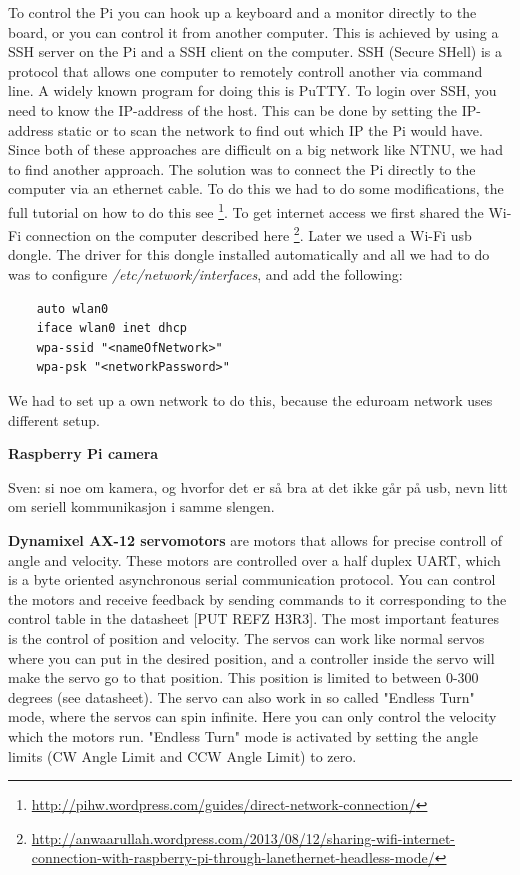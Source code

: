 To control the Pi you can hook up a keyboard and a monitor directly to the board, or you can control it from another computer. 
This is achieved by using a SSH server on the Pi and a SSH client on the computer. 
SSH (Secure SHell) is a protocol that allows one computer to remotely controll another via command line. A widely known program for doing this is PuTTY. To login over SSH, you need to know the IP-address of the host. This can be done by setting the IP-address static or to scan the network to find out which IP the Pi would have. Since both of these approaches are difficult on a big network like NTNU, we had to find another approach. The solution was to connect the Pi directly to the computer via an ethernet cable. To do this we had to do some modifications, the full tutorial on how to do this see \footnote{\url{http://pihw.wordpress.com/guides/direct-network-connection/}}. To get internet access we first shared the Wi-Fi connection on the computer described here \footnote{\url{http://anwaarullah.wordpress.com/2013/08/12/sharing-wifi-internet-connection-with-raspberry-pi-through-lanethernet-headless-mode/}}. Later we used a Wi-Fi usb dongle. The driver for this dongle installed automatically and all we had to do was to configure \textit{/etc/network/interfaces}, and add the following:
\begin{verbatim}
    auto wlan0
    iface wlan0 inet dhcp
    wpa-ssid "<nameOfNetwork>"
    wpa-psk "<networkPassword>"
\end{verbatim}
We had to set up a own network to do this, because the eduroam network uses different setup.
\bigskip

\textbf{Raspberry Pi camera}

Sven: si noe om kamera, og hvorfor det er så bra at det ikke går på usb, nevn litt om seriell kommunikasjon i samme slengen.
\bigskip

\textbf{Dynamixel AX-12 servomotors}
are motors that allows for precise controll of angle and velocity. These motors are controlled over a half duplex UART, which is a byte oriented asynchronous serial communication protocol. You can control the motors and receive feedback by sending commands to it corresponding to the control table in the datasheet [PUT REFZ H3R3]. The most important features is the control of position and velocity. The servos can work like normal servos where you can put in the desired position, and a controller inside the servo will make the servo go to that position. This position is limited to between 0-300 degrees (see datasheet). The servo can also work in so called "Endless Turn" mode, where the servos can spin infinite. Here you can only control the velocity which the motors run. "Endless Turn" mode is activated by setting the angle limits (CW Angle Limit and CCW Angle Limit) to zero.
\bigskip

